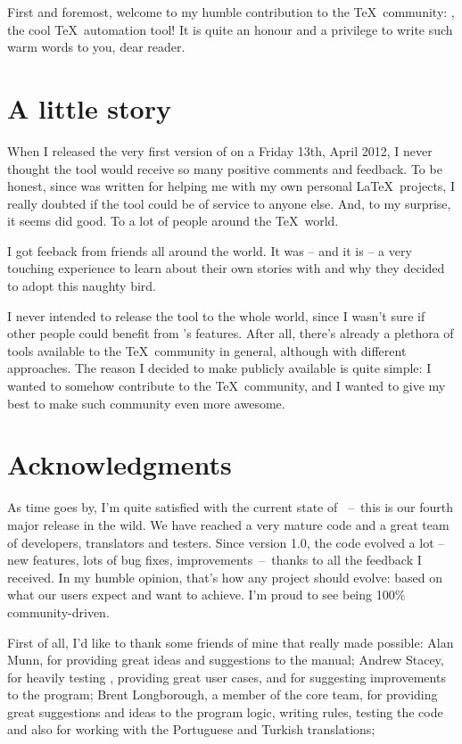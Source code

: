 \documentclass[a4paper,twoside,12pt]{memoir}
\begin{document}
First and foremost, welcome to my humble contribution to the \TeX\ community: \arara, the cool \TeX\ automation tool! It is quite an honour and a privilege to write such warm words to you, dear reader.

\section{A little story}

When I released the very first version of \arara on a Friday 13th, April 2012, I never thought the tool would receive so many positive comments and feedback. To be honest, since \arara was written for helping me with my own personal \LaTeX\ projects, I really doubted if the tool could be of service to anyone else. And, to my surprise, it seems \arara did good. To a lot of people around the \TeX\ world.

\begin{remark}[frametitle={Personal stories}]
I got feeback from friends all around the world. It was -- and it is -- a very touching experience to learn about their own stories with \arara and why they decided to adopt this naughty bird.
\end{remark}

I never intended to release the tool to the whole world, since I wasn't sure if other people could benefit from \arara's features. After all, there's already a plethora of tools available to the \TeX\ community in general, although with different approaches. The reason I decided to make \arara publicly available is quite simple: I wanted to somehow contribute to the \TeX\ community, and I wanted to give my best to make such community even more awesome.

\section{Acknowledgments}

As time goes by, I'm quite satisfied with the current state of \arara~--~this is our fourth major release in the wild. We have reached a very mature code and a great team of developers, translators and testers. Since version 1.0, the code evolved a lot -- new features, lots of bug fixes, improvements~--~thanks to all the feedback I received. In my humble opinion, that's how any project should evolve: based on what our users expect and want to achieve. I'm proud to see \arara being 100\% community-driven.

First of all, I'd like to thank some friends of mine that really made \arara possible: Alan Munn, for providing great ideas and suggestions to the manual; Andrew Stacey, for heavily testing \arara, providing great user cases, and for suggesting improvements to the program; Brent Longborough, a member of the core team, for providing great suggestions and ideas to the program logic, writing rules, testing the code and also for working with the Portuguese and Turkish translations;
\end{document}
